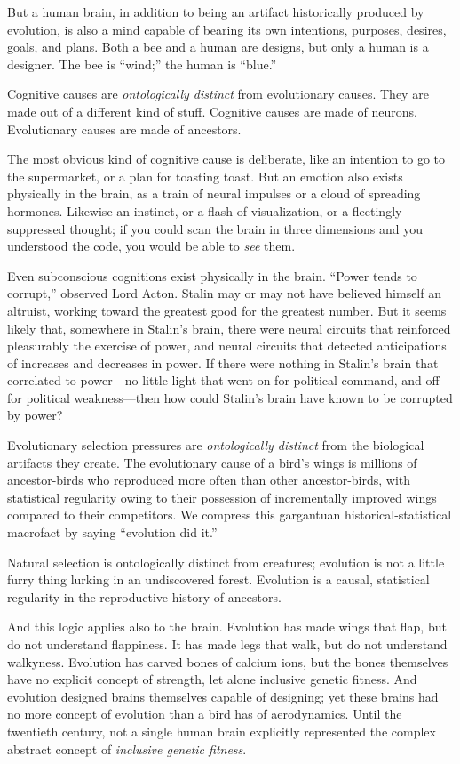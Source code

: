 {
 But a human brain, in addition to being an artifact historically
produced by evolution, is also a mind capable of bearing its own
intentions, purposes, desires, goals, and plans. Both a bee and a human
are designs, but only a human is a designer. The bee is
``wind;'' the human is
``blue.''}

{
 Cognitive causes are \textit{ontologically distinct} from
evolutionary causes. They are made out of a different kind of stuff.
Cognitive causes are made of neurons. Evolutionary causes are made of
ancestors.}

{
 The most obvious kind of cognitive cause is deliberate, like an
intention to go to the supermarket, or a plan for toasting toast. But
an emotion also exists physically in the brain, as a train of neural
impulses or a cloud of spreading hormones. Likewise an instinct, or a
flash of visualization, or a fleetingly suppressed thought; if you
could scan the brain in three dimensions and you understood the code,
you would be able to \textit{see} them.}

{
 Even subconscious cognitions exist physically in the brain.
``Power tends to corrupt,'' observed
Lord Acton. Stalin may or may not have believed himself an altruist,
working toward the greatest good for the greatest number. But it seems
likely that, somewhere in Stalin's brain, there were
neural circuits that reinforced pleasurably the exercise of power, and
neural circuits that detected anticipations of increases and decreases
in power. If there were nothing in Stalin's brain that
correlated to power---no little light that went on for political
command, and off for political weakness---then how could
Stalin's brain have known to be corrupted by power?}

{
 Evolutionary selection pressures are \textit{ontologically
distinct} from the biological artifacts they create. The evolutionary
cause of a bird's wings is millions of ancestor-birds
who reproduced more often than other ancestor-birds, with statistical
regularity owing to their possession of incrementally improved wings
compared to their competitors. We compress this gargantuan
historical-statistical macrofact by saying ``evolution
did it.''}

{
 Natural selection is ontologically distinct from creatures;
evolution is not a little furry thing lurking in an undiscovered
forest. Evolution is a causal, statistical regularity in the
reproductive history of ancestors.}

{
 And this logic applies also to the brain. Evolution has made wings
that flap, but do not understand flappiness. It has made legs that
walk, but do not understand walkyness. Evolution has carved bones of
calcium ions, but the bones themselves have no explicit concept of
strength, let alone inclusive genetic fitness. And evolution designed
brains themselves capable of designing; yet these brains had no more
concept of evolution than a bird has of aerodynamics. Until the
twentieth century, not a single human brain explicitly represented the
complex abstract concept of \textit{inclusive genetic fitness}.}

